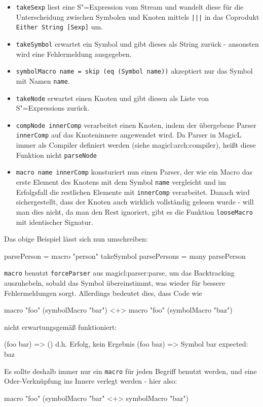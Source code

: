 \documentclass[a4paper, bibgerm]{book}
\newcommand\icode[1]{\lstinline?#1?}
\newcommand\sref{}
\newcommand{\sexp}{S"=Expression}
\newcommand{\sexps}{S"=Expressions}
\begin{document}
\begin{itemize}
\item \icode{takeSexp} liest eine \sexp{} vom Stream und wandelt diese
  für die Unterscheidung zwischen Symbolen und Knoten mittels
  \icode{|||} in das Coprodukt \icode{Either String [Sexp]} um.
\item \icode{takeSymbol} erwartet ein Symbol und gibt dieses als String
  zurück - ansonsten wird eine Fehlermeldung ausgegeben.
\item \icode{symbolMacro name = skip (eq (Symbol name))} akzeptiert nur
  das Symbol mit Namen \icode{name}.
\item \icode{takeNode} erwartet einen Knoten und gibt diesen als Liste
  von \sexps{} zurück.
\item \icode{compNode innerComp} verarbeitet einen Knoten, indem der
  übergebene Parser \icode{innerComp} auf das Knoteninnere angewendet
  wird. Da Parser in MagicL immer als Compiler definiert werden (siehe
  \sref{magicl:arch:compiler}), heißt diese Funktion nicht \icode{parseNode}
\item \icode{macro name innerComp} %
  konsturiert nun einen Parser, der wie ein Macro das erste Element des
  Knotens mit dem Symbol \icode{name} vergleicht und im Erfolgsfall die
  restlichen Elemente mit \icode{innerComp} verarbeitet. Danach wird
  sichergestellt, dass der Knoten auch wirklich vollständig gelesen
  wurde - will man dies nicht, da man den Rest ignoriert, gibt es die
  Funktion \icode{looseMacro} mit identischer Signatur.
\end{itemize}
Das obige Beispiel lässt sich nun umschreiben:
\begin{code}
parsePerson  = macro "person" takeSymbol
parsePersons = many parsePerson
\end{code}

\icode{macro} benutzt \icode{forceParser} aus
\sref{magicl:parser:parse}, um das Backtracking auszuhebeln, sobald das
Symbol übereinstimmt, was wieder für bessere Fehlermeldungen
sorgt. Allerdings bedeutet dies, dass Code wie
\begin{code}
macro "foo" (symbolMacro "bar") <+> macro "foo" (symbolMacro "baz")
\end{code}
nicht erwartungsgemäß funktioniert:
\begin{code}
(foo bar)   => ()  d.h. Erfolg, kein Ergebnis
(foo baz)   => Symbol bar expected: baz
\end{code}
Es sollte deshalb immer nur ein \icode{macro} für jeden Begriff benutzt
werden, und eine Oder-Verknüpfung ins Innere verlegt werden - hier also:
\begin{code}
macro "foo" (symbolMacro "bar" <+> symbolMacro "baz")
\end{code}
\end{document}
